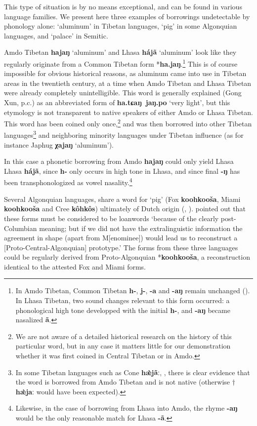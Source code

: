 \documentclass[oneside,a4paper,11pt]{article}
\newcommand{\ipa}[1]{\textbf{{\phon\mbox{#1}}}}
\begin{document}
This type of situation is by no means exceptional, and can be found in various language families. We present here three examples of borrowings undetectable by phonology alone: `aluminum' in Tibetan languages, `pig' in some Algonquian languages, and `palace' in Semitic. 

Amdo Tibetan \ipa{hajaŋ} `aluminum' and Lhasa \ipa{hájã} `aluminum' look like they regularly originate from a Common Tibetan form *\ipa{ha.jaŋ}.\footnote{In Amdo Tibetan, Common Tibetan \ipa{h-}, \ipa{j-}, \ipa{-a} and \ipa{-aŋ} remain unchanged (\citealt{gong16amdo}). In Lhasa Tibetan, two sound changes relevant to this form occurred: a phonological high tone developped with the initial \ipa{h-}, and \ipa{-aŋ} became nasalized \ipa{ã}.} This is of course impossible for obvious historical reasons, as aluminum came into use in Tibetan areas in the twentieth century, at a time when Amdo Tibetan and Lhasa Tibetan were already completely unintelligible. This word is generally explained (Gong Xun, p.c.) as an abbreviated form of \ipa{ha.tɕaŋ jaŋ.po} `very light', but this etymology is not transparent to native speakers of either Amdo or Lhasa Tibetan. This word has been coined only once,\footnote{We are not aware of a detailed historical research on the history of this particular word, but in any case it matters little for our demonstration whether it was first coined in Central Tibetan or in Amdo.} and was then borrowed into other Tibetan languages\footnote{In some Tibetan languages such as Cone \ipa{hæ̀jãː}, \citet[306]{jacques14cone}, there is clear evidence that the word is borrowed from Amdo Tibetan and is not native (otherwise $\dagger$\ipa{hæ̀jaː} would have been expected). } and neighboring minority languages under Tibetan influence (as for instance Japhug \ipa{χajaŋ} `aluminum').

In this case a phonetic borrowing from Amdo \ipa{hajaŋ} could only yield Lhasa Lhasa \ipa{hájã}, since \ipa{h-} only occurs in high tone in Lhasa, and since final \ipa{-ŋ} has been transphonologized as vowel nasality.\footnote{Likewise, in the case of borrowing from Lhasa into Amdo, the rhyme \ipa{-aŋ} would be the only reasonable match for Lhasa \ipa{-ã}.} 

Several Algonquian languages, share a word for `pig' (Fox \ipa{koohkooša}, Miami \ipa{koohkooša} and Cree \ipa{kôhkôs}) ultimately of Dutch origin (\citealt{goddard74dutch}, \citealt{costa13borrowing}). \citet[266]{hockett57k} pointed out that these forms must be considered to be loanwords `because of the clearly post-Columbian meaning; but if we did not have the extralinguistic information the agreement in shape (apart from M[enominee]) would lead us to reconstruct a [Proto-Central-Algonquian] prototype.' The forms from these three languages could be regularly derived from Proto-Algonquian *\ipa{koohkooša}, a reconstruction identical to the attested Fox and Miami forms.
\end{document}
